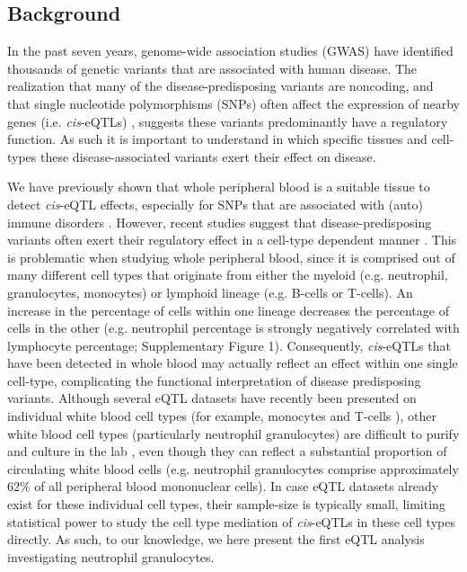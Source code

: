   \subsection{Background}
  In the past seven years, genome-wide association studies (GWAS) have identified thousands of genetic 
  variants that are associated with human disease\cite{Hindorff:2009}. The realization that many of 
  the disease-predisposing variants are noncoding, and that single nucleotide polymorphisms (SNPs) 
  often affect the expression of nearby genes (i.e. \emph{cis}-eQTLs) \cite{Powell:2012, Lude:2011, Zeller:2010}, 
  suggests these variants predominantly have a regulatory function. As such it is important to understand 
  in which specific tissues and cell-types these disease-associated variants exert their effect on disease.

  We have previously shown that whole peripheral blood is a suitable tissue to detect \emph{cis}-eQTL effects, 
  especially for SNPs that are associated with (auto) immune disorders \cite{Lude:2011, Westra:2013}. However, recent studies 
  suggest that disease-predisposing variants often exert their regulatory effect in a cell-type dependent 
  manner \cite{Brown:2013, Fairfax:2012, Fu:2012, Dimas:2009, Breitling:2008a}. This is problematic 
  when studying whole peripheral blood, since it is comprised out of   many different cell types that originate 
  from either the myeloid (e.g. neutrophil, granulocytes, monocytes) or lymphoid lineage (e.g. 
  B-cells or T-cells). An increase in the percentage of cells within one lineage decreases the 
  percentage of cells in the other (e.g. neutrophil percentage is strongly negatively correlated with 
  lymphocyte percentage; Supplementary Figure 1). Consequently, \emph{cis}-eQTLs that have been 
  detected in whole blood may actually reflect an effect within one single 
  cell-type, complicating the functional interpretation of disease predisposing variants. Although 
  several eQTL datasets have recently been presented on individual white blood cell types (for example, 
  monocytes\cite{Zeller:2010, Fairfax:2012} and T-cells \cite{Fairfax:2012, Ding:2010}), other white 
  blood cell types (particularly neutrophil granulocytes) are difficult to purify and culture in the lab 
  \cite{Grisham:1985}, even though they can reflect a substantial 
  proportion of circulating white blood cells (e.g. neutrophil granulocytes comprise approximately 62\% 
  of all peripheral blood mononuclear cells). In case eQTL datasets already exist for these individual 
  cell types, their sample-size is typically small, limiting statistical power to study the cell type 
  mediation of \emph{cis}-eQTLs in these cell types directly. As such, to our knowledge, we here present the 
  first eQTL analysis investigating neutrophil granulocytes.

